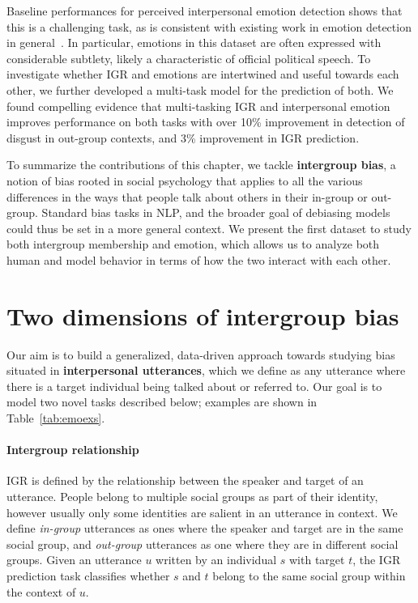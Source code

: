 Baseline performances for perceived interpersonal emotion detection shows that this is a challenging task, as is consistent with existing work in emotion detection in general~\cite{demszky-etal-2020-goemotions}. In particular, emotions in this dataset are often expressed with considerable subtlety, likely a characteristic of official political speech. To investigate whether IGR and emotions are intertwined and useful towards each other, we further developed a multi-task model for the prediction of both. We found compelling evidence that multi-tasking IGR and interpersonal emotion improves performance on both tasks with over 10\% improvement in detection of disgust in out-group contexts, and 3\% improvement in IGR prediction.

To summarize the contributions of this chapter, we tackle \textbf{intergroup bias}, a notion of bias rooted in social psychology that applies to all the various differences in the ways that people talk about others in their in-group or out-group. Standard bias tasks in NLP, and the broader goal of debiasing models could thus be set in a more general context. We present the first dataset to study both intergroup membership and emotion, which allows us to analyze both human and model behavior in terms of how the two interact with each other.

\section{Two dimensions of intergroup bias}
\label{section:twitter-dimensions}

Our aim is to build a generalized, data-driven approach towards studying bias situated in \textbf{interpersonal utterances}, which we define as any utterance where there is a target individual being talked about or referred to. Our goal is to model two novel tasks described below; examples are shown in Table~\ref{tab:emoexs}.

\paragraph{Intergroup relationship} IGR is defined by the relationship between the speaker and target of an utterance. People belong to multiple social groups as part of their identity, however usually only some identities are salient in an utterance in context. We define \emph{in-group} utterances as ones where the speaker and target are in the same social group, and \emph{out-group} utterances as one where they are in different social groups. Given an utterance $u$ written by an individual $s$ with target $t$, the IGR prediction task classifies whether $s$ and $t$ belong to the same social group within the context of $u$.

